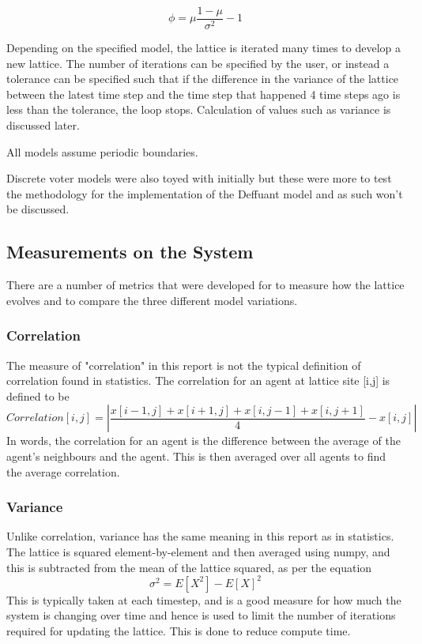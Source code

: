 \documentclass{article}
\begin{document}
\[\phi = \mu\frac{1-\mu}{\sigma^{2}}-1\]

Depending on the specified model, the lattice is iterated many times to develop a new lattice. The number of iterations can be specified by the user, or instead a tolerance can be specified such that if the difference in the variance of the lattice between the latest time step and the time step that happened 4 time steps ago is less than the tolerance, the loop stops. Calculation of values such as variance is discussed later.

All models assume periodic boundaries.

Discrete voter models were also toyed with initially but these were more to test the methodology for the implementation of the Deffuant model and as such won't be discussed.

\subsection{Measurements on the System}
There are a number of metrics that were developed for to measure how the lattice evolves and to compare the three different model variations.

\subsubsection{Correlation}
The measure of "correlation" in this report is not the typical definition of correlation found in statistics. The correlation for an agent at lattice site [i,j] is defined to be
\[Correlation[i,j] = |\frac{x[i-1,j] + x[i+1,j] + x[i,j-1] + x[i,j+1]}{4} - x[i,j]|\]
 In words, the correlation for an agent is the difference between the average of the agent's neighbours and the agent. This is then averaged over all agents to find the average correlation.

 \subsubsection{Variance}
 Unlike correlation, variance has the same meaning in this report as in statistics. The lattice is squared element-by-element and then averaged using numpy, and this is subtracted from the mean of the lattice squared, as per the equation
 \[\sigma^{2} = E[X^{2}] - E[X]^{2}\]
 This is typically taken at each timestep, and is a good measure for how much the system is changing over time and hence is used to limit the number of iterations required for updating the lattice. This is done to reduce compute time.
\end{document}
